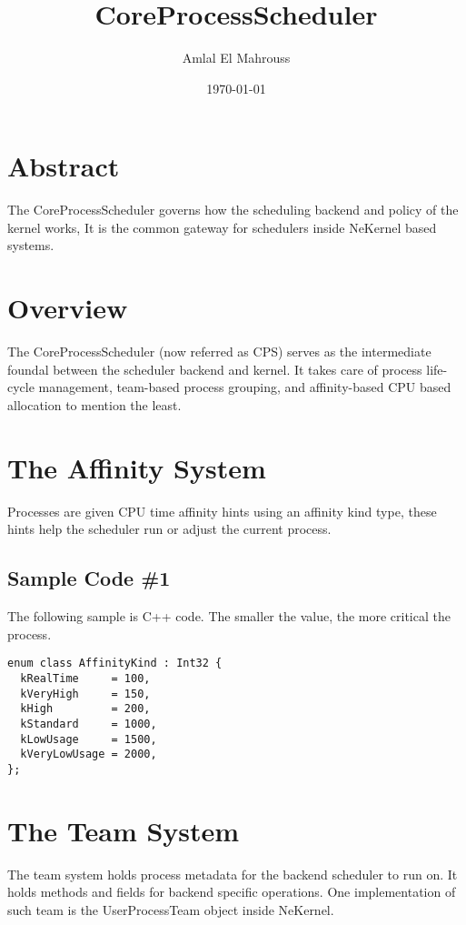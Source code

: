 \documentclass{article}
\title{CoreProcessScheduler}
\author{Amlal El Mahrouss}
\date{\today}
\begin{document}
\maketitle

\section{Abstract}

{The CoreProcessScheduler governs how the scheduling backend and policy of the kernel works, It is the common gateway for schedulers inside NeKernel based systems.}

\section{Overview}

{The CoreProcessScheduler (now referred as CPS) serves as the intermediate foundal between the scheduler backend and kernel.} {It takes care of process life-cycle management, team-based process grouping, and affinity-based CPU based allocation to mention the least.}

\section{The Affinity System}

{Processes are given CPU time affinity hints using an affinity kind type, these hints help the scheduler run or adjust the current process.}

\subsection{Sample Code \#1}

{The following sample is C++ code.} {The smaller the value, the more critical the process.}

\begin{verbatim}
enum class AffinityKind : Int32 {
  kRealTime     = 100,
  kVeryHigh     = 150,
  kHigh         = 200,
  kStandard     = 1000,
  kLowUsage     = 1500,
  kVeryLowUsage = 2000,
};
\end{verbatim}

\section{The Team System}

{The team system holds process metadata for the backend scheduler to run on. It holds methods and fields for backend specific operations.} {One implementation of such team is the UserProcessTeam object inside NeKernel.}
\end{document}
